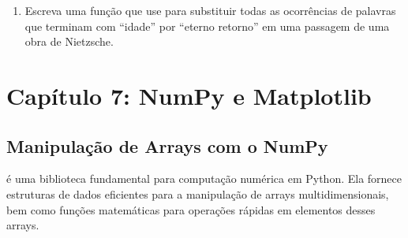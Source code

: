 \documentclass[letterpaper,10pt,english]{jupyterBook}
\begin{document}
\begin{enumerate}
\begin{sphinxVerbatim}[commandchars=\\\{\}]
 
 
\end{sphinxVerbatim}

\item {} 
\sphinxAtStartPar
{}
Escreva uma função que use  para substituir todas as ocorrências de palavras que terminam com “idade” por “eterno retorno” em uma passagem de uma obra de Nietzsche.

\end{enumerate}

\sphinxAtStartPar
{}

\begin{sphinxVerbatim}[commandchars=\\\{\}]
 
 

 
 
\end{sphinxVerbatim}

\sphinxstepscope


\chapter{Capítulo 7: NumPy e Matplotlib}
\label{\detokenize{chapters/ch7/ch7:capitulo-7-numpy-e-matplotlib}}\label{\detokenize{chapters/ch7/ch7::doc}}

\section{Manipulação de Arrays com o NumPy}
\label{\detokenize{chapters/ch7/ch7:manipulacao-de-arrays-com-o-numpy}}
\sphinxAtStartPar
{} é uma biblioteca fundamental para computação numérica em Python. Ela fornece estruturas de dados eficientes para a manipulação de arrays multidimensionais, bem como funções matemáticas para operações rápidas em elementos desses arrays.
\end{document}
